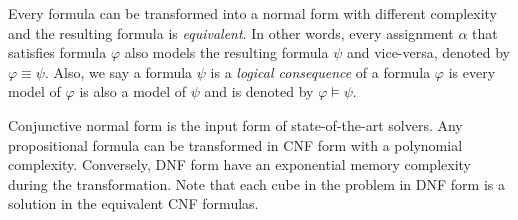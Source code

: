 Every formula can be transformed into a normal form with different complexity and the resulting formula is 
\emph{equivalent}.  
In other words, every assignment $\alpha$ that satisfies formula $\varphi$  also models the resulting formula $\psi$
and vice-versa, denoted by $\varphi \equiv \psi$.
 Also, we say a formula $\psi$ is a \emph{logical consequence} of a formula $\varphi$ is every model of $\varphi$
 is also a model of $\psi$ and is denoted by $\varphi \models \psi$.

Conjunctive normal form is the input form of state-of-the-art solvers. Any propositional
formula can be transformed in CNF form with a polynomial complexity. Conversely, DNF form have
an exponential memory complexity during the transformation.
Note that each cube in the problem in DNF form is a solution in the equivalent CNF formulas.


